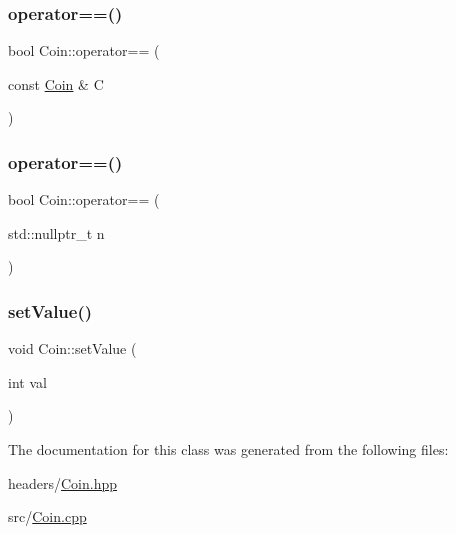 \subsubsection{\texorpdfstring{operator==()}{operator==()}\hspace{0.1cm}{\footnotesize\ttfamily [1/2]}}
{\footnotesize\ttfamily bool Coin\+::operator== (\begin{DoxyParamCaption}\item[{const \mbox{\hyperlink{class_coin}{Coin}} \&}]{C }\end{DoxyParamCaption})}

\mbox{\label{class_coin_a20ef59bfc867081e452d38daded77e08}} 
\subsubsection{\texorpdfstring{operator==()}{operator==()}\hspace{0.1cm}{\footnotesize\ttfamily [2/2]}}
{\footnotesize\ttfamily bool Coin\+::operator== (\begin{DoxyParamCaption}\item[{std\+::nullptr\+\_\+t}]{n }\end{DoxyParamCaption})}

\mbox{\label{class_coin_a87813c8eef4d59ef8136b0cc651a80de}} 
\subsubsection{\texorpdfstring{set\+Value()}{setValue()}}
{\footnotesize\ttfamily void Coin\+::set\+Value (\begin{DoxyParamCaption}\item[{int}]{val }\end{DoxyParamCaption})}



The documentation for this class was generated from the following files\+:\begin{DoxyCompactItemize}
\item 
headers/\mbox{\hyperlink{_coin_8hpp}{Coin.\+hpp}}\item 
src/\mbox{\hyperlink{_coin_8cpp}{Coin.\+cpp}}\end{DoxyCompactItemize}
